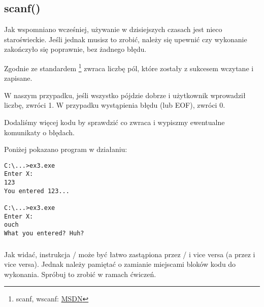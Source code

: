 \subsection{scanf()}

Jak wspomniano wcześniej, używanie \scanf w dzisiejszych czasach jest nieco staroświeckie.
Jeśli jednak musisz to zrobić, należy się upewnić czy wykonanie \scanf zakończyło się poprawnie, bez żadnego błędu.



Zgodnie ze standardem \scanf\footnote{scanf, wscanf: \href{https://docs.microsoft.com/en-us/cpp/c-runtime-library/reference/scanf-scanf-l-wscanf-wscanf-l?view=vs-2019}{MSDN}} zwraca liczbę pól, które zostały z sukcesem wczytane i zapisane.

W naszym przypadku, jeśli wszystko pójdzie dobrze i użytkownik wprowadził liczbę, \scanf zwróci 1. W przypadku wystąpienia błędu (lub \ac{EOF}), zwróci 0.

Dodaliśmy więcej kodu by sprawdzić co zwraca \scanf i wypiszmy ewentualne komunikaty o błędach.

Poniżej pokazano program w działaniu:

\begin{lstlisting}
C:\...>ex3.exe
Enter X:
123
You entered 123...

C:\...>ex3.exe
Enter X:
ouch
What you entered? Huh?
\end{lstlisting}






\subsubsection{\Exercise}

Jak widać, instrukcja / może być łatwo zastąpiona przez / i vice versa
(a  przez  i vice versa).
Jednak należy pamiętać o zamianie miejscami bloków kodu do wykonania. Spróbuj to zrobić w ramach ćwiczeń.

